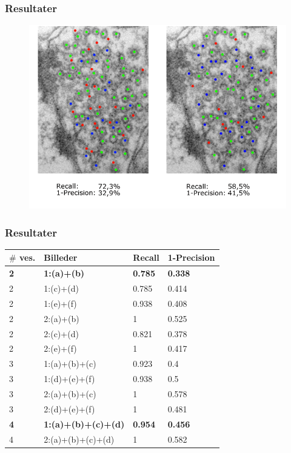 \documentclass[12pt,t]{beamer}
\begin{document}
\begin{frame}
\frametitle{Resultater}
\begin{figure}[H]
	\centering
	\includegraphics[scale=0.4]{img/afstand/res_2.png}
\end{figure}
\end{frame}


\begin{frame}
\frametitle{Resultater}

\begin{table}[H]
	\begin{tabular}{l|l|l|l}
		$\#$ ves. & Billeder & Recall & 1-Precision \\\hline
		\textbf{2}	&	\textbf{1:(a)+(b)}	 							&\textbf{0.785} 	&\textbf{0.338}\\\hline
		2	&	1:(c)+(d)	 							&0.785 	&0.414\\\hline
		2	&	1:(e)+(f)								&0.938 	&0.408\\\hline
		2	&	2:(a)+(b)  					&1 		&0.525\\\hline
		2	&	2:(c)+(d)  					&0.821 	&0.378\\\hline
		2	&	2:(e)+(f)  					&1 		&0.417\\\hline
		3	&	1:(a)+(b)+(c)	 						&0.923 	&0.4\\\hline
		3	&	1:(d)+(e)+(f)	 						&0.938 	&0.5\\\hline
		3	&	2:(a)+(b)+(c)				&1 		&0.578\\\hline
		3	&	2:(d)+(e)+(f)				&1 		&0.481\\\hline
		\textbf{4}	&	\textbf{1:(a)+(b)+(c)+(d)}						&\textbf{0.954} 	&\textbf{0.456}\\\hline
		4	&	2:(a)+(b)+(c)+(d)  			&1 		&0.582\\
	\end{tabular}
\end{table}
\end{frame}
\end{document}
